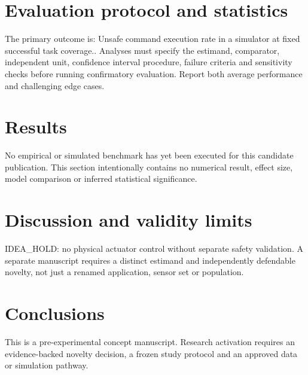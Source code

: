\documentclass[11pt,a4paper]{article}
\begin{document}
\section{Evaluation protocol and statistics}
The primary outcome is: Unsafe command execution rate in a simulator at fixed successful task coverage.. Analyses must specify the estimand, comparator, independent unit, confidence interval procedure, failure criteria and sensitivity checks before running confirmatory evaluation. Report both average performance and challenging edge cases.
\section{Results}
No empirical or simulated benchmark has yet been executed for this candidate publication. This section intentionally contains no numerical result, effect size, model comparison or inferred statistical significance.
\section{Discussion and validity limits}
IDEA\_HOLD: no physical actuator control without separate safety validation. A separate manuscript requires a distinct estimand and independently defendable novelty, not just a renamed application, sensor set or population.
\section{Conclusions}
This is a pre-experimental concept manuscript. Research activation requires an evidence-backed novelty decision, a frozen study protocol and an approved data or simulation pathway.
\end{document}
